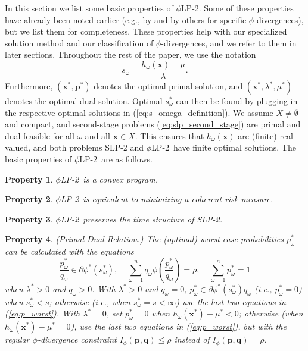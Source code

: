 \documentclass[opre,nonblindrev]{informs3} %
\newcommand{\x}{\mathbf{x}}
\newcommand{\q}{\mathbf{q}}
\newcommand{\p}{\mathbf{p}}
\newtheorem{property}{Property}
\newcommand{\plp}{$\phi$LP-2}
\begin{document}
In this section we list some basic properties of \plp.
Some of these properties have already been noted earlier (e.g., by \citet{bental2013robust,bental_teboulle_07} and by others for specific $\phi$-divergences), but we list them for completeness.
These properties help with our specialized solution method and our classification of $\phi$-divergences, and we refer to them in later sections.
Throughout the rest of the paper, we use the notation
\begin{equation}
	s_\omega = \frac{h_\omega(\x) - \mu}{\lambda}. \label{eq:s_omega_definition}
\end{equation}
Furthermore, $(\x^*, \p^*)$ denotes the optimal primal solution, and $(\x^*, \lambda^*, \mu^*)$ denotes the optimal dual solution.
Optimal $s_\omega^*$ can then be found by plugging in the respective optimal solutions in (\ref{eq:s_omega_definition}). 
We assume $X \neq \emptyset$ and compact, and second-stage problems (\ref{eq:slp_second_stage}) are primal and dual feasible for all $\omega$ and all $\x \in X$. 
This ensures that $h_\omega(\x)$ are (finite) real-valued,  and both problems SLP-2 and \plp\ have finite optimal solutions.  
The basic properties of \plp\ are as follows.


\begin{property}
	\label{property:convex}
	\plp\ is a convex program.
\end{property}

\begin{property}
	\label{property:coherent_risk_measure}
	\plp\ is equivalent to minimizing a coherent risk measure.
\end{property}

\begin{property}
	\label{property:time_structure}
	\plp\ preserves the time structure of SLP-2.
\end{property}

\begin{property} {\sc (Primal-Dual Relation.)}
	\label{property:primal_dual_relation}
	The (optimal) worst-case probabilities $p^*_\omega$ can be calculated with the equations
	\begin{equation}\label{eq:p_worst}
		\frac{p_\omega^*}{q_\omega} \in \partial \phi^*\left(s_\omega^*\right), \ \ \ \ \ \sum_{\omega=1}^n q_\omega \phi\left(\frac{p_\omega^*}{q_\omega}\right) = \rho, \ \ \ \ \ \sum_{\omega=1}^n p_\omega^* = 1
	\end{equation}		
when $\lambda^*>0$ and $q_\omega >0$. 
	With $\lambda^*>0$ and $q_\omega =0$, $p_\omega^* \in \partial \phi^*\left(s_\omega^*\right) q_\omega$ (i.e., $p_\omega^* = 0$) when $s_\omega^* < \bar{s}$; otherwise (i.e., when $s_\omega^* = \bar{s}<\infty$) use the last two equations in (\ref{eq:p_worst}). 
	With $\lambda^*=0$, set $p_\omega^* = 0$ when $h_\omega(\x^*) - \mu^* < 0$; otherwise (when $h_\omega(\x^*) - \mu^* = 0$), use the last two equations in (\ref{eq:p_worst}), but with the regular $\phi$-divergence constraint $I_{\phi}(\p,\q)\leq \rho$ instead of $I_{\phi}(\p,\q)=\rho$. 
%
\end{property}
\end{document}

